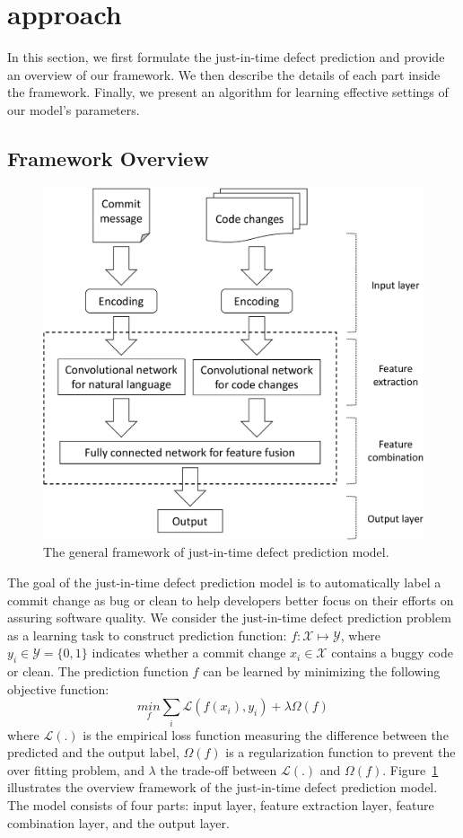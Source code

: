 \section{approach}
\label{sec:approach}
In this section, we first formulate the just-in-time defect prediction and provide an overview of our framework. We then describe the details of each part inside the framework. Finally, we present an algorithm for learning effective settings of our model's parameters. 
\subsection{Framework Overview}
\label{sec:overview}

\begin{figure}
\center
\includegraphics[scale=0.36]{figs/framework.pdf}
\caption{The general framework of just-in-time defect prediction model.}
\label{fig:overview}
\end{figure}

The goal of the just-in-time defect prediction model is to automatically label a commit change as bug or clean to help developers better focus on their efforts on assuring software quality. We consider the just-in-time defect prediction problem as a learning task to construct prediction function: $f:
\mathcal{X} \longmapsto \mathcal{Y}$, where $y_i \in \mathcal{Y} = \{0, 1\}$ indicates whether a commit change $x_i \in \mathcal{X}$ contains a buggy code or clean. The prediction function $f$ can be learned by minimizing the following objective function:
\begin{equation}
\underset{f}{min} \sum_{i}\mathcal{L}(f(x_i), y_i) + \lambda\Omega(f)
\end{equation}
where $\mathcal{L}(.)$ is the empirical loss function measuring the difference between the predicted and the output label, $\Omega(f)$ is a regularization function to prevent the over fitting problem, and $\lambda$ the trade-off between $\mathcal{L}(.)$ and $\Omega(f)$. Figure~\ref{fig:overview} illustrates the overview framework of the just-in-time defect prediction model. The model consists of four parts: input layer, feature extraction layer, feature combination layer, and the output layer.  